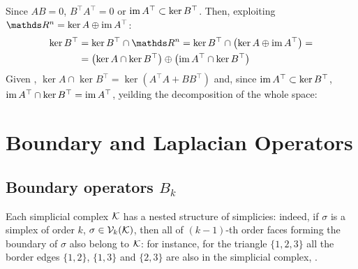 

Since \( A B = 0\), \( B^\top A^\top = 0 \) or \( \operatorname{im} A^\top \subset \ker B^\top \). Then, exploiting \( \ds R^n = \ker A \oplus \im A^\top \): 
\begin{equation}
      \begin{aligned}
            \ker B^\top & = \ker B^\top \cap \ds R^n = \ker B^\top \cap \left( \ker A \oplus \im A^\top \right) = \\
            & = \left( \ker A \cap \ker B^\top \right) \oplus \left( \im A^\top \cap \ker B^\top \right)
      \end{aligned}
\end{equation}
Given , \( \ker A \cap \ker B^\top = \ker \left(  A^\top A + B B^\top \right) \) and, since \( \operatorname{im} A^\top \subset \ker B^\top \), \( \operatorname{im} A^\top \cap \ker B^\top = \operatorname{im} A^\top \), yeilding the decomposition of  the whole space:





\section{ Boundary and Laplacian Operators }

\subsection{Boundary operators \( B_k \)}

Each simplicial complex \( \mathcal{K} \) has a nested structure of simplicies: indeed, if \( \sigma \) is a simplex of order \( k \), \( \sigma \in \mathcal{V}_{k}(\mathcal{K}) \), then all of \( (k-1)\)-th order faces forming the boundary of \( \sigma \) also belong to \( \mathcal{K} \): for instance, for the triangle \( \{ 1, 2, 3  \} \) all the border edges \( \{ 1, 2\} \), \( \{ 1, 3\}\) and \( \{ 2, 3 \}\) are also in the simplicial complex, . 

